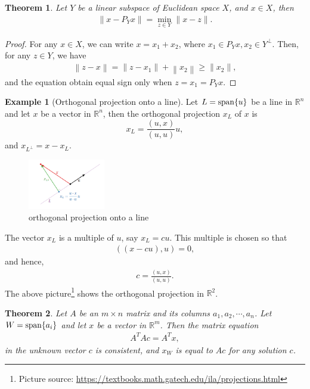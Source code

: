 \documentclass[11pt]{book}
\newtheorem{theorem}{Theorem}[chapter]
\theoremstyle{definition}
\newtheorem{example}{Example}[chapter]
\numberwithin{equation}{chapter}
\begin{document}
\medskip

\begin{theorem}
Let $Y$ be a linear subspace of Euclidean space $X$, and $x\in X$, then 
\begin{align*}
    \left\|x - P_Y x \right\| = \min_{z\in Y} \|x - z\|.
\end{align*}
\end{theorem}
\begin{proof}
For any $x\in X$, we can write $x = x_1 + x_2$, where $x_1\in P_Y x, x_2\in Y^\perp$. Then, for any $z\in Y$, we have
\begin{align*}
    \left\|z - x\right\| = \|z - x_1\| +  \left\|x_2\right\| \geq \|x_2\|,
\end{align*}
and the equation obtain equal sign only when $z = x_1 = P_Y x$.
\end{proof}

\medskip

\begin{example}[Orthogonal projection onto a line]\label{Orthogonal projection onto a line}
Let $L = {\rm span}\{u\}$ be a line in $\mathbb{R}^n$ and let $x$ be a vector in $\mathbb{R}^n$, then the orthogonal projection $x_L$ of $x$ is $$x_L = \frac{(u,x)}{(u,u)}u,$$
and $x_{L^\bot} = x - x_L$.
\begin{figure}[H]
    \centering
    \includegraphics[width=0.3\textwidth]{Orthogonal_projection_1}
    \caption{orthogonal projection onto a line}
    \label{fig:plot_1}
\end{figure}
The vector $x_L$ is a multiple of $u$, say $x_L = cu$. This multiple is chosen so that 
\begin{align*}
    ((x - cu), u) = 0,
\end{align*}
and hence,
\begin{align*}
    c = \frac{(u, x)}{(u, u)}.
\end{align*}
The above picture\footnote{Picture source: \url{https://textbooks.math.gatech.edu/ila/projections.html}} shows the orthogonal projection in $\mathbb{R}^2$.
\end{example}

\medskip

\begin{theorem}
Let $A$ be an $m \times n$ matrix and its columns $a_1, a_2, \cdots, a_n$. Let $W = {\rm span}\{a_i\}$ and let $x$ be a vector in $\mathbb{R}^m$. Then the matrix equation
\begin{align*}
    A^T Ac = A^T x,
\end{align*}
in the unknown vector $c$ is consistent, and $x_W$ is equal to $Ac$ for any solution $c$.
\end{theorem}
\end{document}
